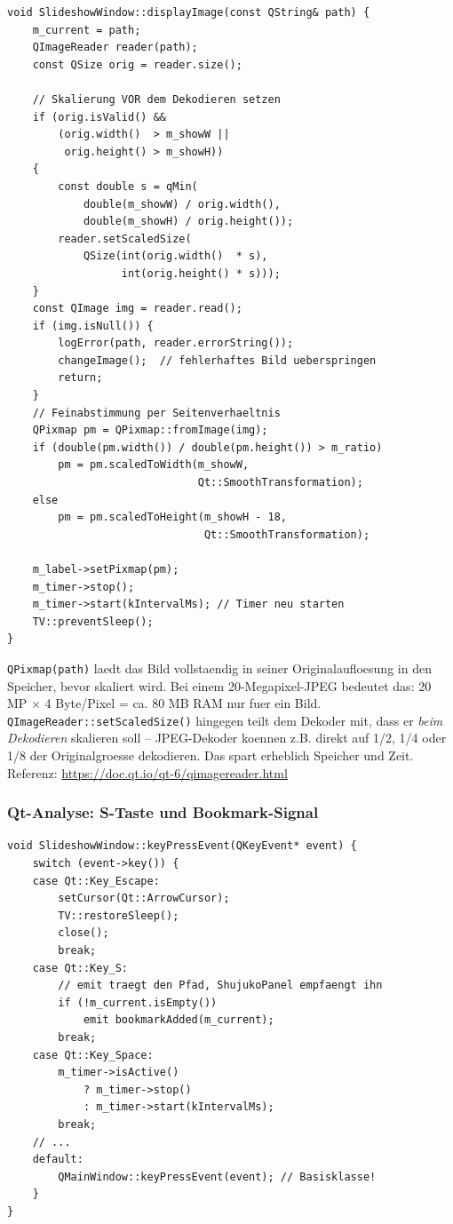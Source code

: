 \begin{lstlisting}[caption={displayImage: effizientes Laden grosser Bilder}]
void SlideshowWindow::displayImage(const QString& path) {
    m_current = path;
    QImageReader reader(path);
    const QSize orig = reader.size();

    // Skalierung VOR dem Dekodieren setzen
    if (orig.isValid() &&
        (orig.width()  > m_showW ||
         orig.height() > m_showH))
    {
        const double s = qMin(
            double(m_showW) / orig.width(),
            double(m_showH) / orig.height());
        reader.setScaledSize(
            QSize(int(orig.width()  * s),
                  int(orig.height() * s)));
    }
    const QImage img = reader.read();
    if (img.isNull()) {
        logError(path, reader.errorString());
        changeImage();  // fehlerhaftes Bild ueberspringen
        return;
    }
    // Feinabstimmung per Seitenverhaeltnis
    QPixmap pm = QPixmap::fromImage(img);
    if (double(pm.width()) / double(pm.height()) > m_ratio)
        pm = pm.scaledToWidth(m_showW,
                              Qt::SmoothTransformation);
    else
        pm = pm.scaledToHeight(m_showH - 18,
                               Qt::SmoothTransformation);

    m_label->setPixmap(pm);
    m_timer->stop();
    m_timer->start(kIntervalMs); // Timer neu starten
    TV::preventSleep();
}
\end{lstlisting}

\begin{qtinfo}[title={Qt-Hintergrund: QImageReader vs. QPixmap(path)}]
\verb|QPixmap(path)| laedt das Bild vollstaendig in
seiner Originalaufloesung in den Speicher, bevor
skaliert wird. Bei einem 20-Megapixel-JPEG bedeutet
das: 20 MP $\times$ 4 Byte/Pixel = ca. 80 MB RAM nur
fuer ein Bild.\\
\verb|QImageReader::setScaledSize()| hingegen teilt dem
Dekoder mit, dass er \emph{beim Dekodieren} skalieren
soll -- JPEG-Dekoder koennen z.B. direkt auf 1/2, 1/4
oder 1/8 der Originalgroesse dekodieren. Das spart
erheblich Speicher und Zeit.\\
Referenz: \url{https://doc.qt.io/qt-6/qimagereader.html}
\end{qtinfo}

\subsubsection{Qt-Analyse: S-Taste und Bookmark-Signal}

\begin{lstlisting}[caption={keyPressEvent: S-Taste sendet Signal}]
void SlideshowWindow::keyPressEvent(QKeyEvent* event) {
    switch (event->key()) {
    case Qt::Key_Escape:
        setCursor(Qt::ArrowCursor);
        TV::restoreSleep();
        close();
        break;
    case Qt::Key_S:
        // emit traegt den Pfad, ShujukoPanel empfaengt ihn
        if (!m_current.isEmpty())
            emit bookmarkAdded(m_current);
        break;
    case Qt::Key_Space:
        m_timer->isActive()
            ? m_timer->stop()
            : m_timer->start(kIntervalMs);
        break;
    // ...
    default:
        QMainWindow::keyPressEvent(event); // Basisklasse!
    }
}
\end{lstlisting}

